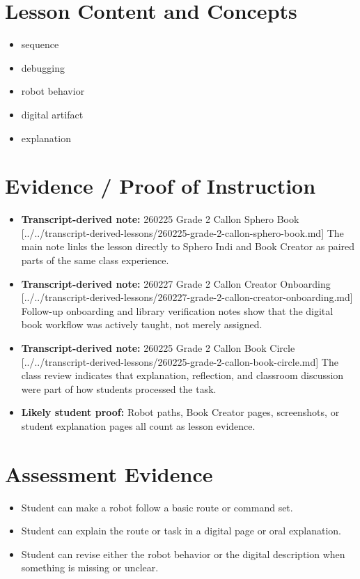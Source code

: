 \documentclass[11pt]{article}
\begin{document}
\section*{Lesson Content and Concepts}
\begin{itemize}[leftmargin=*]
\item sequence
\item debugging
\item robot behavior
\item digital artifact
\item explanation
\end{itemize}

\section*{Evidence / Proof of Instruction}
\begin{itemize}[leftmargin=*]
\item \textbf{Transcript-derived note:} 260225 Grade 2 Callon Sphero Book [../../transcript-derived-lessons/260225-grade-2-callon-sphero-book.md] The main note links the lesson directly to Sphero Indi and Book Creator as paired parts of the same class experience.
\item \textbf{Transcript-derived note:} 260227 Grade 2 Callon Creator Onboarding [../../transcript-derived-lessons/260227-grade-2-callon-creator-onboarding.md] Follow-up onboarding and library verification notes show that the digital book workflow was actively taught, not merely assigned.
\item \textbf{Transcript-derived note:} 260225 Grade 2 Callon Book Circle [../../transcript-derived-lessons/260225-grade-2-callon-book-circle.md] The class review indicates that explanation, reflection, and classroom discussion were part of how students processed the task.
\item \textbf{Likely student proof:} Robot paths, Book Creator pages, screenshots, or student explanation pages all count as lesson evidence.
\end{itemize}

\section*{Assessment Evidence}
\begin{itemize}[leftmargin=*]
\item Student can make a robot follow a basic route or command set.
\item Student can explain the route or task in a digital page or oral explanation.
\item Student can revise either the robot behavior or the digital description when something is missing or unclear.
\end{itemize}
\end{document}
